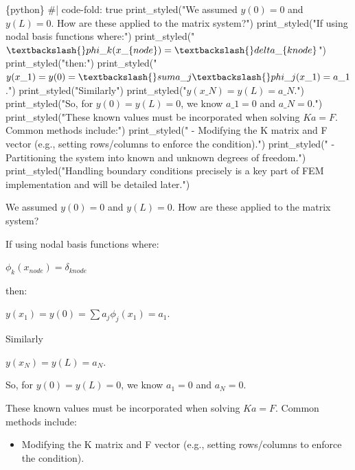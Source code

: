 \documentclass[
  11pt,
  a4paper,
]{scrbook}
\newenvironment{Shaded}{\begin{snugshade}}{\end{snugshade}}
\newcommand{\InformationTok}[1]{\textcolor[rgb]{0.37,0.37,0.37}{#1}}
\providecommand{\tightlist}{%
  \setlength{\itemsep}{0pt}\setlength{\parskip}{0pt}}\usepackage{longtable,booktabs,array}
\begin{document}
\begin{Shaded}
\begin{Highlighting}[]
\InformationTok{\textasciigrave{}\textasciigrave{}\textasciigrave{}\{python\}}
\InformationTok{\#| code{-}fold: true}
\InformationTok{print\_styled("We assumed $y(0)=0$ and $y(L)=0$. How are these applied to the matrix system?")}
\InformationTok{print\_styled("If using nodal basis functions where:")}
\InformationTok{print\_styled("$\textbackslash{}phi\_k(x\_\{node\}) = \textbackslash{}delta\_\{knode\}$")}
\InformationTok{print\_styled("then:")}
\InformationTok{print\_styled("$y(x\_1) = y(0) = \textbackslash{}sum a\_j \textbackslash{}phi\_j(x\_1) = a\_1$.")}
\InformationTok{print\_styled("Similarly")}
\InformationTok{print\_styled("$y(x\_N) = y(L) = a\_N$.")}
\InformationTok{print\_styled("So, for $y(0)=y(L)=0$, we know $a\_1 = 0$ and $a\_N = 0$.")}
\InformationTok{print\_styled("These known values must be incorporated when solving $Ka=F$. Common methods include:")}
\InformationTok{print\_styled("  {-} Modifying the K matrix and F vector (e.g., setting rows/columns to enforce the condition).")}
\InformationTok{print\_styled("  {-} Partitioning the system into known and unknown degrees of freedom.")}
\InformationTok{print\_styled("Handling boundary conditions precisely is a key part of FEM implementation and will be detailed later.")}
\InformationTok{\textasciigrave{}\textasciigrave{}\textasciigrave{}}
\end{Highlighting}
\end{Shaded}

We assumed \(y(0)=0\) and \(y(L)=0\). How are these applied to the
matrix system?

If using nodal basis functions where:

\(\phi_k(x_{node}) = \delta_{knode}\)

then:

\(y(x_1) = y(0) = \sum a_j \phi_j(x_1) = a_1\).

Similarly

\(y(x_N) = y(L) = a_N\).

So, for \(y(0)=y(L)=0\), we know \(a_1 = 0\) and \(a_N = 0\).

These known values must be incorporated when solving \(Ka=F\). Common
methods include:

\begin{itemize}
\tightlist
\item
  Modifying the K matrix and F vector (e.g., setting rows/columns to
  enforce the condition).
\end{itemize}
\end{document}

